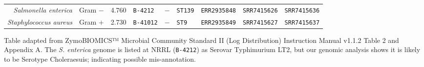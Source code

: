 \documentclass[a4paper,num-refs]{oup-contemporary}
\begin{document}
\begin{table}[t!]
\begin{tabular}{r | l | l | l | l | l | c | c c }
\textit{Salmonella enterica}        & Gram $-$ & 4.760 & \texttt{B-4212}    & $-$& \texttt{ST139} & \texttt{ERR2935848} & \texttt{SRR7415626} &	\texttt{SRR7415636}\\
\textit{Staphylococcus aureus}      & Gram $+$ & 2.730 & \texttt{B-41012}  & $-$& \texttt{ST9}  & \texttt{ERR2935849} & \texttt{SRR7415627} & \texttt{SRR7415637}\\
\bottomrule
\end{tabular}
\begin{tablenotes}
\item Table adapted from ZymoBIOMICS™ Microbial Community Standard II (Log Distribution) Instruction Manual v1.1.2 Table 2 and Appendix A.
The \textit{S. enterica} genome is listed at NRRL (\texttt{B-4212}) as Serovar Typhimurium LT2, but our genomic analysis shows it is likely to be Serotype Choleraesuis; indicating possible mis-annotation.
\end{tablenotes}
\end{table}
\end{document}
